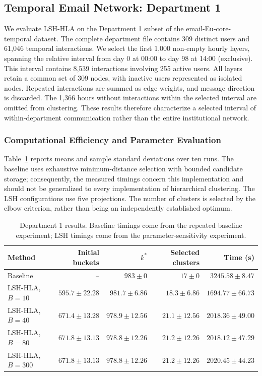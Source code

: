 \subsection{Temporal Email Network: Department 1}

We evaluate LSH-HLA on the Department 1 subset of the email-Eu-core-temporal dataset. The complete department file contains 309 distinct users and 61,046 temporal interactions. We select the first 1,000 non-empty hourly layers, spanning the relative interval from day 0 at 00:00 to day 98 at 14:00 (exclusive). This interval contains 8,539 interactions involving 255 active users. All layers retain a common set of 309 nodes, with inactive users represented as isolated nodes. Repeated interactions are summed as edge weights, and message direction is discarded. The 1,366 hours without interactions within the selected interval are omitted from clustering. These results therefore characterize a selected interval of within-department communication rather than the entire institutional network.

\subsubsection*{Computational Efficiency and Parameter Evaluation}
Table~\ref{tab:dept1_performance} reports means and sample standard deviations over ten runs. The baseline uses exhaustive minimum-distance selection with bounded candidate storage; consequently, the measured timings concern this implementation and should not be generalized to every implementation of hierarchical clustering. The LSH configurations use five projections. The number of clusters is selected by the elbow criterion, rather than being an independently established optimum.

\begin{table}[ht]
\centering
\begin{tabular}{lrrrr}
\hline
Method & Initial buckets & $k^*$ & Selected clusters & Time (s) \\
\hline
Baseline & -- & $983\pm0$ & $17\pm0$ & $3245.58\pm8.47$ \\
LSH-HLA, $B=10$ & $595.7\pm22.28$ & $981.7\pm6.86$ & $18.3\pm6.86$ & $1694.77\pm66.73$ \\
LSH-HLA, $B=40$ & $671.4\pm13.28$ & $978.9\pm12.56$ & $21.1\pm12.56$ & $2018.36\pm49.00$ \\
LSH-HLA, $B=80$ & $671.8\pm13.13$ & $978.8\pm12.26$ & $21.2\pm12.26$ & $2018.12\pm47.29$ \\
LSH-HLA, $B=300$ & $671.8\pm13.13$ & $978.8\pm12.26$ & $21.2\pm12.26$ & $2020.45\pm44.23$ \\
\hline
\end{tabular}
\caption{Department 1 results. Baseline timings come from the repeated baseline experiment; LSH timings come from the parameter-sensitivity experiment.}
\label{tab:dept1_performance}
\end{table}

